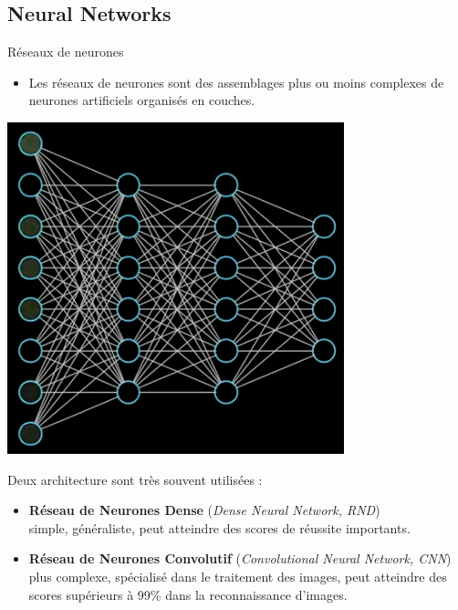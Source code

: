 \documentclass[10pt,serif,mathserif,compress,hyperref={colorlinks}]{beamer}
\begin{document}
\subsection{Neural Networks}

\begin{frame}{Réseaux de neurones}

  \begin{minipage}{.6\textwidth}
    \begin{itemize}
    \item Les réseaux de neurones sont des assemblages plus ou moins complexes de neurones artificiels organisés en couches.
    \end{itemize}
  \end{minipage}\begin{minipage}{.4\textwidth}
    \vspace*{-6mm}\includegraphics[width=\textwidth]{images/RN.png}
  \end{minipage}
  
  Deux architecture sont très souvent utilisées :
  \begin{itemize}
    \item \textbf{Réseau de Neurones Dense} ({\em Dense Neural Network, RND})\\
      simple, généraliste, peut atteindre des scores de réussite importants.
    \item \textbf{Réseau de Neurones Convolutif} ({\em Convolutional Neural Network, CNN})\\
      plus complexe, spécialisé dans le traitement des images, peut atteindre des scores supérieurs à 99\% dans la reconnaissance d'images.
  \end{itemize}
  
\end{frame}
\end{document}
